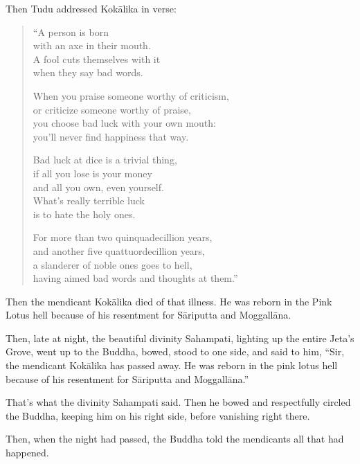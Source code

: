 \documentclass[12pt,openany]{book}%
\begin{document}
Then Tudu addressed \textsanskrit{Kokālika} in verse: 

\begin{verse}%
“A person is born \\
with an axe in their mouth. \\
A fool cuts themselves with it \\
when they say bad words. 

When you praise someone worthy of criticism, \\
or criticize someone worthy of praise, \\
you choose bad luck with your own mouth: \\
you’ll never find happiness that way. 

Bad luck at dice is a trivial thing, \\
if all you lose is your money \\
and all you own, even yourself. \\
What’s really terrible luck \\
is to hate the holy ones. 

For more than two quinquadecillion years, \\
and another five quattuordecillion years, \\
a slanderer of noble ones goes to hell, \\
having aimed bad words and thoughts at them.” 

%
\end{verse}

Then the mendicant \textsanskrit{Kokālika} died of that illness. He was reborn in the Pink Lotus hell because of his resentment for \textsanskrit{Sāriputta} and \textsanskrit{Moggallāna}. 

Then, late at night, the beautiful divinity Sahampati, lighting up the entire Jeta’s Grove, went up to the Buddha, bowed, stood to one side, and said to him, “Sir, the mendicant \textsanskrit{Kokālika} has passed away. He was reborn in the pink lotus hell because of his resentment for \textsanskrit{Sāriputta} and \textsanskrit{Moggallāna}.” 

That’s what the divinity Sahampati said. Then he bowed and respectfully circled the Buddha, keeping him on his right side, before vanishing right there. 

Then, when the night had passed, the Buddha told the mendicants all that had happened. 
\end{document}

